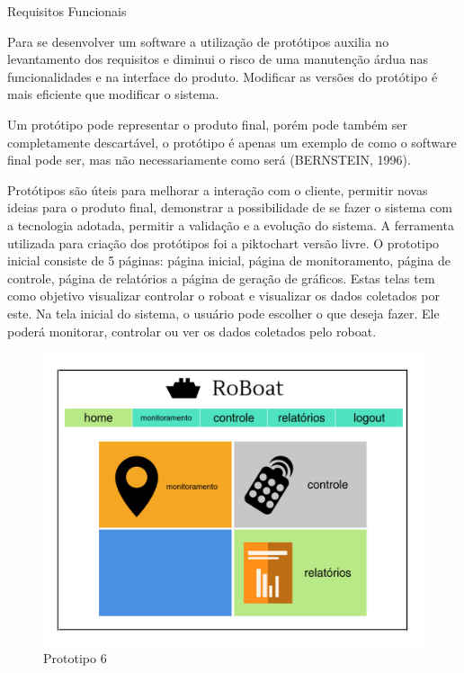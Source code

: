 Requisitos Funcionais


Para se desenvolver um software a utilização de protótipos auxilia no levantamento dos requisitos e diminui o risco de uma manutenção árdua nas funcionalidades e na interface do produto. Modificar as versões do protótipo é mais eficiente que modificar o sistema.

Um  protótipo  pode  representar  o  produto  final,  porém  pode  também  ser
completamente  descartável,  o  protótipo  é  apenas  um  exemplo  de  como  o  software
final pode ser, mas não necessariamente como será (BERNSTEIN, 1996).

Protótipos são úteis para melhorar a interação com o cliente, permitir novas ideias para o produto final, demonstrar a possibilidade de se fazer o sistema com a tecnologia adotada,  permitir a validação e a evolução do sistema.
A  ferramenta  utilizada  para  criação  dos  protótipos  foi  a piktochart versão livre. 
O  prototipo  inicial  consiste  de  5  páginas:  página  inicial, página de monitoramento, página de controle, página de relatórios a página de geração de gráficos. Estas telas tem como objetivo visualizar controlar o roboat e visualizar os dados coletados por este.
Na tela inicial do sistema, o usuário pode escolher o que deseja fazer. Ele poderá monitorar, controlar ou ver os dados coletados pelo roboat.

 \begin{figure} [!htp]
	\centering
	\includegraphics[scale=0.3]{figuras/prototipo-6}
	\caption{Prototipo 6}
	\label{Prototipo 6}
\end{figure}
\FloatBarrier

